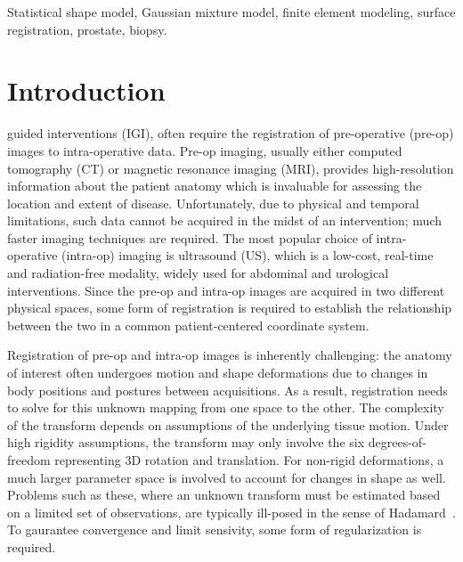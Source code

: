 \documentclass[journal]{IEEEtran}
\begin{document}
\begin{IEEEkeywords}
Statistical shape model, Gaussian mixture model, finite element modeling, surface registration, prostate, biopsy.
\end{IEEEkeywords}

\IEEEpeerreviewmaketitle


\section{Introduction}
 guided interventions (IGI), often require the registration of pre-operative (pre-op) images to intra-operative data. Pre-op imaging, usually either computed tomography (CT) or magnetic resonance imaging (MRI), provides high-resolution information about the patient anatomy which is invaluable for assessing the location and extent of disease. Unfortunately, due to physical and temporal limitations, such data cannot be acquired in the midst of an intervention; much faster imaging techniques are required.  The most popular choice of intra-operative (intra-op) imaging is ultrasound (US), which is a low-cost, real-time and radiation-free modality, widely used for abdominal and urological interventions. Since the pre-op and intra-op images are acquired in two different physical spaces, some form of registration is required to establish the relationship between the two in a common patient-centered coordinate system.

Registration of pre-op and intra-op images is inherently challenging: the anatomy of interest often undergoes motion and shape deformations due to changes in body positions and postures between acquisitions. As a result, registration needs to solve for this unknown mapping from one space to the other.  The complexity of the transform depends on assumptions of the underlying tissue motion.  Under high rigidity assumptions, the transform may only involve the six degrees-of-freedom representing 3D rotation and translation.  For non-rigid deformations, a much larger parameter space is involved to account for changes in shape as well.  Problems such as these, where an unknown transform must be estimated based on a limited set of observations, are typically ill-posed in the sense of Hadamard~\cite{Hadamard23}.  To gaurantee convergence and limit sensivity, some form of regularization is required.
\end{document}
